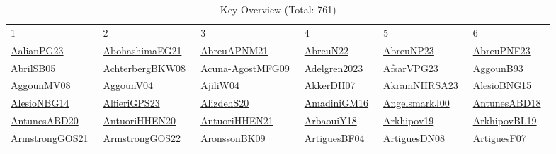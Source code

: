\begin{longtable}{*{6}{l}}
\rowcolor{white}\caption{Key Overview (Total: 761)}\\ \toprule
\rowcolor{white}1 & 2 & 3 & 4 & 5 & 6\\ \midrule
\endhead
\bottomrule
\endfoot
\href{../works/AalianPG23.pdf}{AalianPG23}~\cite{AalianPG23} & \href{../works/AbohashimaEG21.pdf}{AbohashimaEG21}~\cite{AbohashimaEG21} & \href{../works/AbreuAPNM21.pdf}{AbreuAPNM21}~\cite{AbreuAPNM21} & \href{../works/AbreuN22.pdf}{AbreuN22}~\cite{AbreuN22} & \href{../works/AbreuNP23.pdf}{AbreuNP23}~\cite{AbreuNP23} & \href{../works/AbreuPNF23.pdf}{AbreuPNF23}~\cite{AbreuPNF23}\\ 
\href{../works/AbrilSB05.pdf}{AbrilSB05}~\cite{AbrilSB05} & \href{../works/AchterbergBKW08.pdf}{AchterbergBKW08}~\cite{AchterbergBKW08} & \href{../works/Acuna-AgostMFG09.pdf}{Acuna-AgostMFG09}~\cite{Acuna-AgostMFG09} & \href{../works/Adelgren2023.pdf}{Adelgren2023}~\cite{Adelgren2023} & \href{../works/AfsarVPG23.pdf}{AfsarVPG23}~\cite{AfsarVPG23} & \href{../works/AggounB93.pdf}{AggounB93}~\cite{AggounB93}\\ 
\href{../}{AggounMV08}~\cite{AggounMV08} & \href{../}{AggounV04}~\cite{AggounV04} & \href{../}{AjiliW04}~\cite{AjiliW04} & \href{../works/AkkerDH07.pdf}{AkkerDH07}~\cite{AkkerDH07} & \href{../works/AkramNHRSA23.pdf}{AkramNHRSA23}~\cite{AkramNHRSA23} & \href{../}{AlesioBNG15}~\cite{AlesioBNG15}\\ 
\href{../works/AlesioNBG14.pdf}{AlesioNBG14}~\cite{AlesioNBG14} & \href{../works/AlfieriGPS23.pdf}{AlfieriGPS23}~\cite{AlfieriGPS23} & \href{../}{AlizdehS20}~\cite{AlizdehS20} & \href{../works/AmadiniGM16.pdf}{AmadiniGM16}~\cite{AmadiniGM16} & \href{../works/AngelsmarkJ00.pdf}{AngelsmarkJ00}~\cite{AngelsmarkJ00} & \href{../works/AntunesABD18.pdf}{AntunesABD18}~\cite{AntunesABD18}\\ 
\href{../works/AntunesABD20.pdf}{AntunesABD20}~\cite{AntunesABD20} & \href{../works/AntuoriHHEN20.pdf}{AntuoriHHEN20}~\cite{AntuoriHHEN20} & \href{../works/AntuoriHHEN21.pdf}{AntuoriHHEN21}~\cite{AntuoriHHEN21} & \href{../works/ArbaouiY18.pdf}{ArbaouiY18}~\cite{ArbaouiY18} & \href{../}{Arkhipov19}~\cite{Arkhipov19} & \href{../works/ArkhipovBL19.pdf}{ArkhipovBL19}~\cite{ArkhipovBL19}\\ 
\href{../works/ArmstrongGOS21.pdf}{ArmstrongGOS21}~\cite{ArmstrongGOS21} & \href{../works/ArmstrongGOS22.pdf}{ArmstrongGOS22}~\cite{ArmstrongGOS22} & \href{../works/AronssonBK09.pdf}{AronssonBK09}~\cite{AronssonBK09} & \href{../works/ArtiguesBF04.pdf}{ArtiguesBF04}~\cite{ArtiguesBF04} & \href{../}{ArtiguesDN08}~\cite{ArtiguesDN08} & \href{../works/ArtiguesF07.pdf}{ArtiguesF07}~\cite{ArtiguesF07}\\ 

\end{longtable}
